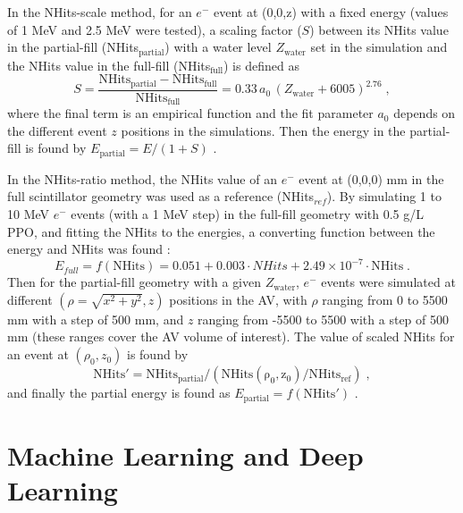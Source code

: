 In the NHits-scale method, for an $e^-$ event at (0,0,z) with a fixed energy (values of 1 MeV and 2.5 MeV were tested), a scaling factor ($S$) between its NHits value in the partial-fill (NHits$_\mathrm{partial}$) with a water level $Z_\mathrm{water}$ set in the simulation and the NHits value in the full-fill (NHits$_\mathrm{full}$) is defined as
\begin{equation}
S = \mathrm{\frac{NHits_{partial} - NHits_{full}}{NHits_{full}}} = 0.33 \, a_0 \, \left( Z_\mathrm{water} + 6005 \right)^{2.76} \; ,
\end{equation}
where the final term is an empirical function and the fit parameter $a_0$ depends on the different event $z$ positions in the simulations. Then the energy in the partial-fill is found by $E_\mathrm{partial} = E/(1 + S)$ \cite{partialEnergy, jiePartialEnergy}.
 
In the NHits-ratio method, the NHits value of an $e^-$ event at (0,0,0) mm in the full scintillator geometry was used as a reference (NHits$_{ref}$). By simulating 1 to 10 MeV $e^-$ events (with a 1 MeV step) in the full-fill geometry with 0.5 g/L PPO, and fitting the NHits to the energies, a converting function between the energy and NHits was found \cite{jiePartialEnergyNhitRatio}: 
\begin{equation}
E_{full} = f(\mathrm{NHits})=0.051+0.003\cdot NHits+2.49\times10^{-7}\cdot \mathrm{NHits} \; .    
\end{equation}
Then for the partial-fill geometry with a given $Z_\mathrm{water}$, $e^-$ events were simulated at different $(\rho=\sqrt{x^2+y^2},z)$ positions in the AV, with $\rho$ ranging from 0 to 5500 mm with a step of 500 mm, and $z$ ranging from -5500 to 5500 with a step of 500 mm (these ranges cover the AV volume of interest). The value of scaled NHits for an event at $(\rho_0,z_0)$ is found by
\begin{equation}
\mathrm{NHits' = NHits_{partial}/(NHits(\rho_0,z_0)/NHits_{ref})} \; ,
\end{equation}
and finally the partial energy is found as $E_\mathrm{partial} = f(\mathrm{NHits'})$ \cite{jiePartialEnergyNhitRatio}.

\section{Machine Learning and Deep Learning}

